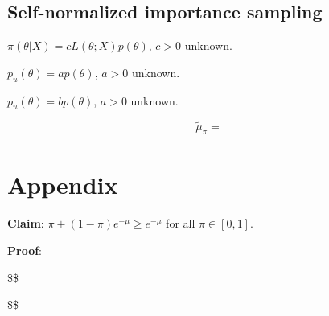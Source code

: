 \documentclass[
  12pt]{article}
\begin{document}
\subsection{Self-normalized importance
sampling}\label{self-normalized-importance-sampling}

\(\pi(\theta | X) = cL(\theta;X)p(\theta)\), \(c > 0\) unknown.

\(p_u(\theta) = a p(\theta)\), \(a > 0\) unknown.

\(p_u(\theta) = b p(\theta)\), \(a > 0\) unknown.

\[
\tilde{\mu}_{\pi} = \frac{}{}
\]

\section{Appendix}\label{appendix}

\textbf{Claim}: \(\pi + (1-\pi)e^{-\mu} \geq e^{-\mu}\) for all
\(\pi \in [0,1]\).

\textbf{Proof}:

\$\$

\$\$
\end{document}
